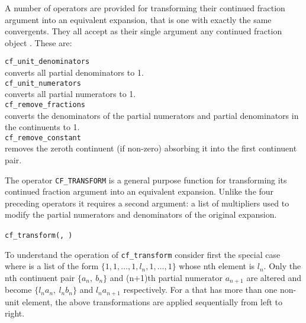 \hypertarget{CF_UNIT_NUMERATORS:operator}{}
\hypertarget{CF_UNIT_DENOMINATORS:operator}{}
\hypertarget{CF_REMOVE_FRACTIONS:operator}{}
\hypertarget{CF_REMOVE_CONSTANT:operator}{}
A number of operators are provided for transforming their continued
fraction argument  into an equivalent expansion,
that is one with exactly the same convergents.
They all accept as their single argument any continued fraction
object .
These are:

\texttt{cf\_unit\_denominators}\\
converts all partial denominators to 1.\\[\baselineskip]
\texttt{cf\_unit\_numerators}\\
converts all partial numerators to 1.\\[\baselineskip]
\texttt{cf\_remove\_fractions}\\
converts the denominators of the partial numerators and partial
denominators in the continuents to 1.\\[\baselineskip]
\texttt{cf\_remove\_constant}\\
removes the zeroth continuent (if non-zero) absorbing it into the
first continuent pair.

\hypertarget{CF_TRANSFORM:operator}{}
The operator \texttt{CF\_TRANSFORM} is a general purpose function
for transforming its continued fraction argument  into
an equivalent expansion. Unlike the four preceding operators it requires
a second argument: a list of multipliers used to modify the partial
numerators and denominators of the original expansion.
\begin{syntaxtable}
  \texttt{cf\_transform(}\texttt{,}\,%
  \texttt{)}
\end{syntaxtable}
To understand the operation of \texttt{cf\_transform} consider first the
special case where  is a list of the
form $\{1, 1, \ldots, 1, l_n, 1, \ldots, 1\}$ whose nth element is $l_n$.
Only the nth continuent pair $\{a_n,\ b_n\}$ and (n+1)th partial numerator
$a_{n+1}$ are altered and become $\{l_na_n,\ l_nb_n\}$ and $l_na_{n+1}$
respectively. For a  that has more than one non-unit
element, the above transformations are applied sequentially from left to
right.

